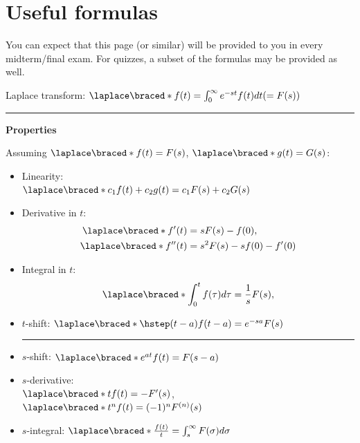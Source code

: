 \chapter{Useful formulas}
\begin{weekintro}
  You can expect that this page (or similar) will be provided to you in every midterm/final exam. For quizzes, a subset of the formulas may be provided as well.
\end{weekintro}

\begin{multicols}{2}

Laplace transform: $\laplace\braced*{f(t)} = \int_0^{\infty} e^{-st}
f(t)dt (=F(s))$

\vspace{0.5em}\hrule\vspace{0.5em}

\textbf{Properties}

Assuming \(\laplace\braced*{f(t)} = F(s)\), \quad \( \laplace\braced*{g(t)} = G(s)\):

\begin{itemize}
\item Linearity: \\$\laplace\braced*{c_1f(t)+c_2g(t)} = c_1F(s)+c_2G(s)$

\item Derivative in \(t\):
  \begin{align*}
    \laplace\braced*{f'(t)} &= sF(s)-f(0), \\
    \laplace\braced*{f''(t)} &= s^2F(s) - sf(0) - f'(0)
  \end{align*}

\item Integral in \(t\):
  \[\laplace\braced*{\int_{0}^{t}f(\tau) d\tau} = \frac{1}{s}F(s), \]

\item \(t\)-shift: $\laplace\braced*{\hstep(t-a)f(t-a)} = e^{-sa}F(s)$

  \vspace{0.5em}\hrule\vspace{0.5em}

\item \(s\)-shift:  $\laplace\braced*{e^{at}f(t)} = F(s-a)$
\item \(s\)-derivative:\\ $\laplace\braced*{tf(t)} = -F'(s)$, \quad $\laplace\braced*{t^nf(t)} = (-1)^n F^{(n)}(s)$
\item \(s\)-integral: $\laplace\braced*{\frac{f(t)}{t}} = \int_s^{\infty} F(\sigma) d\sigma$


\end{itemize}
\end{multicols}
